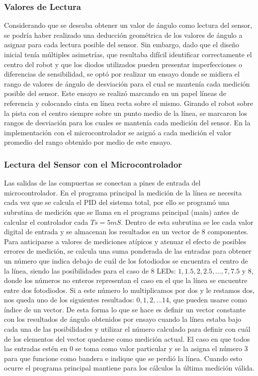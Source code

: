 \documentclass[10pt,conference,a4paper,onecolumn]{article}%
\begin{document}
\subsubsection{Valores de Lectura}
Considerando que se deseaba obtener un valor de ángulo como lectura del sensor, se podría haber realizado una deducción geométrica de los valores de ángulo a asignar para cada lectura posible del sensor. Sin embargo, dado que el diseño inicial tenía múltiples asimetrías, que resultaba difícil identificar correctamente el centro del robot y que los diodos utilizados pueden presentar imperfecciones o diferencias de sensibilidad, se optó por realizar un ensayo donde se midiera el rango de valores de ángulo de desviación para el cual se mantenía cada medición posible del sensor. Este ensayo se realizó marcando en un papel líneas de referencia y colocando cinta en línea recta sobre el mismo. Girando el robot sobre la pista con el centro siempre sobre un punto medio de la línea, se marcaron los rangos de desviación para los cuales se mantenía cada medición del sensor. En la implementación con el microcontrolador se asignó a cada medición el valor promedio del rango obtenido por medio de este ensayo.
\subsubsection{Lectura del Sensor con el Microcontrolador}
Las salidas de las compuertas se conectan a pines de entrada del microcontrolador. En el programa principal la medición de la línea se necesita cada vez que se calcula el PID del sistema total, por ello se programó una subrutina de medición que se llama en el programa principal (main) antes de calcular el controlador cada $Ts=5mS$. Dentro de esta subrutina se lee cada valor digital de entrada y se almacenan los resultados en un vector de 8 componentes. Para anticiparse a valores de mediciones atípicos y atenuar el efecto de posibles errores de medición, se calcula una suma ponderada de las entradas para obtener un número que indica debajo de cuál de los fotodiodos se encuentra el centro de la línea, siendo las posibilidades para el caso de 8 LEDs: $1, 1.5, 2, 2.5,...,7,7.5$ y $8$, donde los números no enteros representan el caso en el que la línea se encuentre entre dos fotodiodos. Si a este número lo multiplicamos por dos y le restamos dos, nos queda uno de los siguientes resultados: $0,1,2,...14$, que pueden usarse como índice de un vector. De esta forma lo que se hace es definir un vector constante con los resultados de ángulo obtenidos por ensayo cuando la línea estaba bajo cada una de las posibilidades y utilizar el número calculado para definir con cuál de los elementos del vector quedarse como medición actual. El caso en que todos
las entradas estén en $0$ se toma como valor particular y se la asigna el número 3 para que funcione como bandera e indique que se perdió la línea. Cuando esto ocurre el programa principal mantiene para los cálculos la última medición válida.
\end{document}

